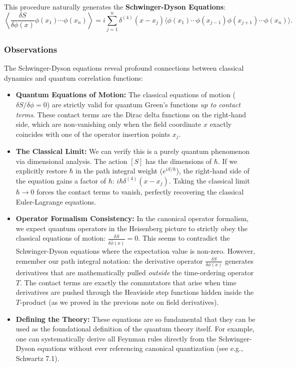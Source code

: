 This procedure naturally generates the \textbf{Schwinger-Dyson Equations}:
\[
    \left\langle \frac{\delta S}{\delta \phi(x)} \phi(x_1) \cdots \phi(x_n) \right\rangle = i \sum_{j=1}^n \delta^{(4)}(x - x_j) \langle \phi(x_1) \cdots \phi(x_{j-1}) \phi(x_{j+1}) \cdots \phi(x_n) \rangle.
\]

\subsubsection{Observations}

The Schwinger-Dyson equations reveal profound connections between classical dynamics and quantum correlation functions:
\begin{itemize}
    \item \textbf{Quantum Equations of Motion:} The classical equations of motion ($\delta S/\delta \phi = 0$) are strictly valid for quantum Green's functions \textit{up to contact terms}. These contact terms are the Dirac delta functions on the right-hand side, which are non-vanishing only when the field coordinate $x$ exactly coincides with one of the operator insertion points $x_j$.
    \item \textbf{The Classical Limit:} We can verify this is a purely quantum phenomenon via dimensional analysis. The action $[S]$ has the dimensions of $\hbar$. If we explicitly restore $\hbar$ in the path integral weight ($e^{iS/\hbar}$), the right-hand side of the equation gains a factor of $\hbar$: $i\hbar \delta^{(4)}(x-x_j)$. Taking the classical limit $\hbar \to 0$ forces the contact terms to vanish, perfectly recovering the classical Euler-Lagrange equations.
    \item \textbf{Operator Formalism Consistency:} In the canonical operator formalism, we expect quantum operators in the Heisenberg picture to strictly obey the classical equations of motion: $\frac{\delta S}{\delta \hat{\phi}(x)} = 0$. This seems to contradict the Schwinger-Dyson equations where the expectation value is non-zero. However, remember our path integral notation: the derivative operator $\frac{\delta S}{\delta \phi(x)}$ generates derivatives that are mathematically pulled \textit{outside} the time-ordering operator $T$. The contact terms are exactly the commutators that arise when time derivatives are pushed through the Heaviside step functions hidden inside the $T$-product (as we proved in the previous note on field derivatives).
    \item \textbf{Defining the Theory:} These equations are so fundamental that they can be used as the foundational definition of the quantum theory itself. For example, one can systematically derive all Feynman rules directly from the Schwinger-Dyson equations without ever referencing canonical quantization (see e.g., Schwartz 7.1).
\end{itemize}

